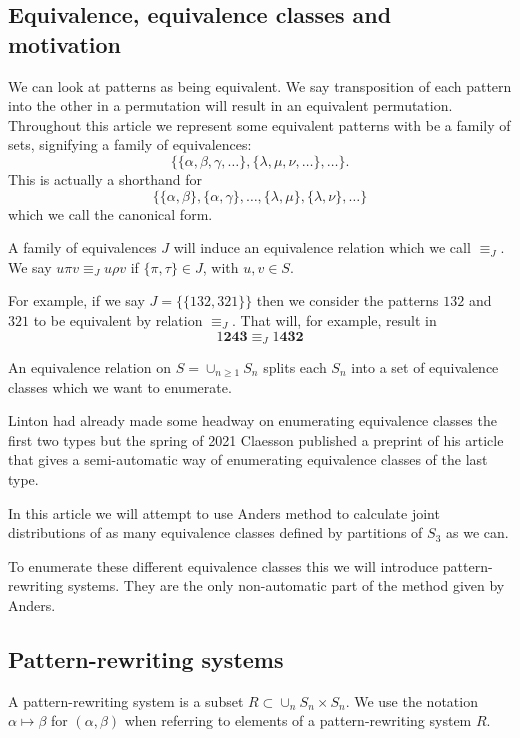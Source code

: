 \documentclass[openany, a4paper, 11pt, english]{article}
\newcommand{\patternrule}{ \mapsto \!}
\theoremstyle{definition}
\newcommand{\Sym}{S}
\begin{document}
\subsection{Equivalence, equivalence classes and motivation}
We can look at patterns as being equivalent. We say transposition of each pattern into
the other in a permutation will result in an equivalent permutation. Throughout
this article we represent some equivalent patterns with be a family of sets, signifying
a family of equivalences:
\[
    \{ \{\alpha, \beta, \gamma, \dots \}, \{\lambda, \mu, \nu, \dots \}, \dots
    \}.
\]
This is actually a shorthand for
\[
    \{ \{ \alpha, \beta \}, \{ \alpha, \gamma \}, \dots, \{ \lambda, \mu \}, \{
        \lambda, \nu \}, \dots \}
\]
which we call the canonical form.

A family of equivalences $J$ will induce an equivalence relation which we call $\equiv_J$. We
say $u \pi v \equiv_J u \rho v$ if $\{ \pi, \tau \} \in J$, with $u,v \in \Sym$.

For example, if we say $J = \{ \{ 132, 321 \} \}$ then we consider the patterns $132$ and $321$ to
be equivalent by relation $\equiv_J$. That will, for example, result in
\[
    1\bm{243} \equiv_J 1\bm{432}
\]

An equivalence relation on $\Sym = \cup_{n \geq 1} \Sym_n$ splits each $\Sym_n$
into a set of equivalence classes which we want to enumerate. 

Linton had already made some headway on enumerating equivalence classes the
first two types but the spring of 2021 Claesson published a preprint of his
article that gives a semi-automatic way of enumerating equivalence classes of
the last type.

In this article we will attempt to use Anders method to calculate joint
distributions of as many equivalence classes defined by partitions of $\Sym_3$
as we can.

To enumerate these different equivalence classes this we will introduce
pattern-rewriting systems. They are the only non-automatic part of the method
given by Anders.

\subsection{Pattern-rewriting systems}
A pattern-rewriting system is a subset $R \subset \cup_{n} \Sym_n \times \Sym_n$.
We use the notation $\alpha \patternrule \beta$ for $(\alpha, \beta)$ when referring
to elements of a pattern-rewriting system $R$. 
\end{document}
